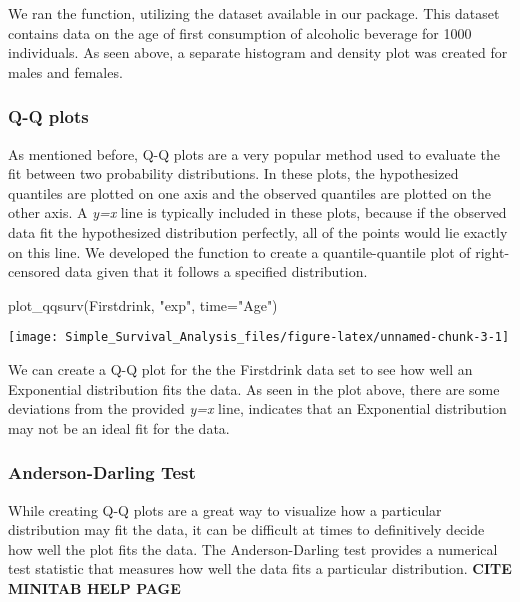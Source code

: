 We ran the  function, utilizing the
 dataset available in our package. This dataset
contains data on the age of first consumption of alcoholic beverage for
1000 individuals. As seen above, a separate histogram and density plot
was created for males and females.

\hypertarget{q-q-plots}{%
\subsubsection{Q-Q plots}\label{q-q-plots}}

As mentioned before, Q-Q plots are a very popular method used to
evaluate the fit between two probability distributions. In these plots,
the hypothesized quantiles are plotted on one axis and the observed
quantiles are plotted on the other axis. A \emph{y=x} line is typically
included in these plots, because if the observed data fit the
hypothesized distribution perfectly, all of the points would lie exactly
on this line. We developed the  function to create a
quantile-quantile plot of right-censored data given that it follows a
specified distribution.

\begin{Schunk}
\begin{Sinput}
plot_qqsurv(Firstdrink, "exp", time="Age")
\end{Sinput}

\texttt{[image: Simple\_Survival\_Analysis\_files/figure-latex/unnamed-chunk-3-1]} \end{Schunk}

We can create a Q-Q plot for the the Firstdrink data set to see how well
an Exponential distribution fits the data. As seen in the plot above,
there are some deviations from the provided \emph{y=x} line, indicates
that an Exponential distribution may not be an ideal fit for the data.

\hypertarget{anderson-darling-test}{%
\subsubsection{Anderson-Darling Test}\label{anderson-darling-test}}

While creating Q-Q plots are a great way to visualize how a particular
distribution may fit the data, it can be difficult at times to
definitively decide how well the plot fits the data. The
Anderson-Darling test provides a numerical test statistic that measures
how well the data fits a particular distribution. \textbf{CITE MINITAB
HELP PAGE}

